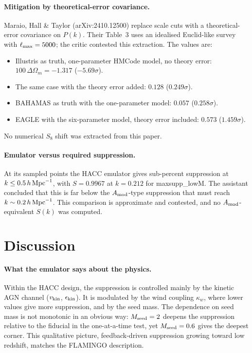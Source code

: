 \documentclass[11pt,a4paper]{article}
\begin{document}
\paragraph{Mitigation by theoretical-error covariance.} Maraio, Hall \& Taylor (arXiv:2410.12500) replace scale cuts with a theoretical-error covariance on $P(k)$. Their Table~3 uses an idealised Euclid-like survey with $\ell_{\rm max}=5000$; the critic contested this extraction. The values are:
\begin{itemize}
\item Illustris as truth, one-parameter HMCode model, no theory error: $100\,\Delta\Omega_m=-1.317$ ($-5.69\sigma$).
\item The same case with the theory error added: $0.128$ ($0.249\sigma$).
\item BAHAMAS as truth with the one-parameter model: $0.057$ ($0.258\sigma$).
\item EAGLE with the six-parameter model, theory error included: $0.573$ ($1.459\sigma$).
\end{itemize}
No numerical $S_8$ shift was extracted from this paper.

\paragraph{Emulator versus required suppression.} At its sampled points the HACC emulator gives sub-percent suppression at $k\le0.5\,h\,{\rm Mpc}^{-1}$, with $S=0.9967$ at $k=0.212$ for maxsupp\_lowM. The assistant concluded that this is far below the $A_{\rm mod}$-type suppression that must reach $k\sim0.2\,h\,{\rm Mpc}^{-1}$. This comparison is approximate and contested, and no $A_{\rm mod}$-equivalent $S(k)$ was computed.

\section{Discussion}
\paragraph{What the emulator says about the physics.} Within the HACC design, the suppression is controlled mainly by the kinetic AGN channel ($v_{\rm kin}$, $\epsilon_{\rm kin}$). It is modulated by the wind coupling $\kappa_w$, where lower values give more suppression, and by the seed mass. The dependence on seed mass is not monotonic in an obvious way: $M_{\rm seed}=2$ deepens the suppression relative to the fiducial in the one-at-a-time test, yet $M_{\rm seed}=0.6$ gives the deepest corner. This qualitative picture, feedback-driven suppression growing toward low redshift, matches the FLAMINGO description.
\end{document}
